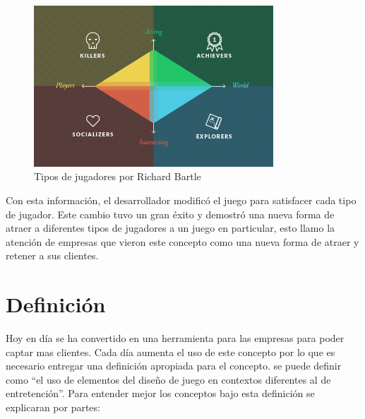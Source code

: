 \begin{figure}[!htb]
  \centering
  \includegraphics[width=0.8\textwidth]{images/TypeOfPlayersBartle.png}
  \caption[Tipos de estereotipos de jugadores]{Tipos de jugadores por Richard Bartle}
  \label{fig:Players}
\end{figure}


Con esta información, el desarrollador modificó el juego para satisfacer cada
tipo de jugador.
Este cambio tuvo un gran éxito y demostró una nueva forma de atraer a diferentes
tipos de jugadores a un juego en particular, esto llamo la atención de empresas
que vieron este concepto como una nueva forma de atraer y retener a sus clientes.

\section{Definición}

Hoy en día {\GAM} se ha convertido en una herramienta para las empresas
para poder captar mas clientes.
Cada día aumenta el uso de este concepto por lo que es necesario entregar una
definición apropiada para el concepto.
{\GAM} se puede definir como ``el uso de elementos del diseño de juego en contextos
diferentes al de entretención''.
Para entender mejor los conceptos bajo esta definición se explicaran por partes:

